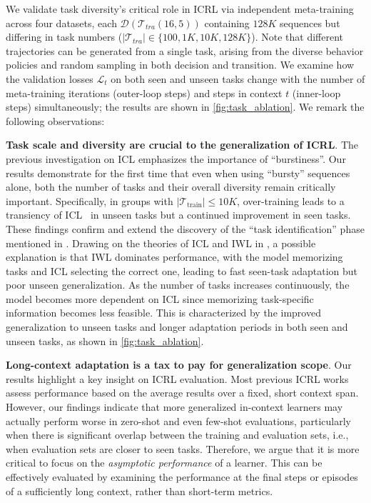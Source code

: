 \documentclass{article}
\renewcommand{\cite}[1]{\citep{#1}}
\begin{document}
We validate task diversity's critical role in ICRL via independent meta-training across four datasets, each $\mathcal{D}(\mathcal{T}_{tra}(16,5))$ containing $128K$ sequences but differing in task numbers ($|\mathcal{T}_{tra}| \in \{100, 1K, 10K, 128K\}$).
Note that different trajectories can be generated from a single task, arising from the diverse behavior policies and random sampling in both decision and transition.
We examine how the validation losses $\mathcal{L}_t$ on both seen and unseen tasks change with the number of meta-training iterations (outer-loop steps) and steps in context $t$ (inner-loop steps) simultaneously; the results are shown in \cref{fig:task_ablation}. We remark the following observations:

\textbf{Task scale and diversity are crucial to the generalization of ICRL}.
The previous investigation on ICL \cite{raparthy2024generalization,chan2022data} emphasizes the importance of ``burstiness''.
Our results demonstrate for the first time that even when using ``bursty'' sequences alone, both the number of tasks and their overall diversity remain critically important. Specifically, in groups with $|\mathcal{T}_{\text{train}}|\le10K$, over-training leads to a transiency of ICL~\cite{singh2024transient} in unseen tasks but a continued improvement in seen tasks. These findings confirm and extend the discovery of the ``task identification'' phase mentioned in \citet{kirsch2022general, pan2023context}.
Drawing on the theories of ICL and IWL in \citet{chantoward}, a possible explanation is that IWL dominates performance, with the model memorizing tasks and ICL selecting the correct one, leading to fast seen-task adaptation but poor unseen generalization. 
As the number of tasks increases continuously, the model becomes more dependent on ICL since memorizing task-specific information becomes less feasible. This is characterized by the improved generalization to unseen tasks and longer adaptation periods in both seen and unseen tasks, as shown in \cref{fig:task_ablation}.

\textbf{Long-context adaptation is a tax to pay for generalization scope}. Our results highlight a key insight on ICRL evaluation. Most previous ICRL works assess performance based on the average results over a fixed, short context span. However, our findings indicate that more generalized in-context learners may actually perform worse in zero-shot and even few-shot evaluations, particularly when there is significant overlap between the training and evaluation sets, i.e., when evaluation sets are closer to seen tasks.
Therefore, we argue that it is more critical to focus on the \emph{asymptotic performance} of a learner. This can be effectively evaluated by examining the performance at the final steps or episodes of a sufficiently long context, rather than short-term metrics.
\end{document}
